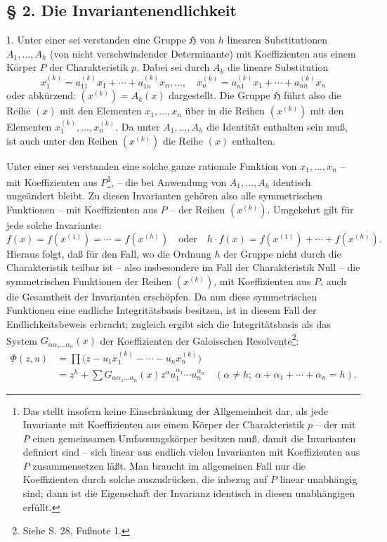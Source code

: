 \subsection*{§ 2. Die Invariantenendlichkeit}

1. Unter einer  sei verstanden eine Gruppe $\mathfrak H$ von $h$ linearen Substitutionen $A_1,\ldots,A_h$ (von nicht verschwindender Determinante) mit Koeffizienten aus einem Körper $P$ der Charakteristik $p$. Dabei sei durch $A_k$ die lineare Substitution
\[
 x_1^{(k)}=a_{11}^{(k)}x_1+\cdots+a_{1n}^{(k)}x_n,\ldots,\quad
 x_n^{(k)}=a_{n1}^{(k)}x_1+\cdots+a_{nn}^{(k)}x_n
\]
oder abkürzend: $(x^{(k)})=A_k(x)$ dargestellt. Die Gruppe $\mathfrak H$ führt also die Reihe $(x)$ mit den Elementen $x_1,\ldots,x_n$ über in die Reihen $(x^{(k)})$ mit den Elementen $x_1^{(k)},\ldots,x_n^{(k)}$. Da unter $A_1,\ldots,A_h$ die Identität enthalten sein muß, ist auch unter den Reihen $(x^{(k)})$ die Reihe $(x)$ enthalten.

Unter einer  sei verstanden eine solche ganze rationale Funktion von $x_1,\ldots,x_n$ -- mit Koeffizienten aus $P$\footnote{Das stellt insofern keine Einschränkung der Allgemeinheit dar, als jede Invariante mit Koeffizienten aus einem Körper der Charakteristik $p$ -- der mit $P$ einen gemeinsamen Umfassungskörper besitzen muß, damit die Invarianten definiert sind -- sich linear aus endlich vielen Invarianten mit Koeffizienten aus $P$ zusammensetzen läßt. Man braucht im allgemeinen Fall nur die Koeffizienten durch solche auszudrücken, die inbezug auf $P$ linear unabhängig sind; dann ist die Eigenschaft der Invarianz identisch in diesen unabhängigen erfüllt.}, -- die bei Anwendung von $A_1,\ldots,A_h$ identisch ungeändert bleibt. Zu diesen Invarianten gehören also alle symmetrischen Funktionen -- mit Koeffizienten aus $P$ -- der Reihen $(x^{(k)})$. Umgekehrt gilt für jede solche Invariante:
\[
 f(x)=f(x^{(1)})=\cdots=f(x^{(h)})
 \quad\text{oder}\quad
 h\cdot f(x)=f(x^{(1)})+\cdots+f(x^{(h)}).
\]
Hieraus folgt, daß für den Fall, wo die Ordnung $h$ der Gruppe nicht durch die Charakteristik teilbar ist -- also insbesondere im Fall der Charakteristik Null -- die symmetrischen Funktionen der Reihen $(x^{(k)})$, mit Koeffizienten aus $P$, auch die Gesamtheit der Invarianten erschöpfen. Da nun diese symmetrischen Funktionen eine endliche Integritätsbasis besitzen, ist in diesem Fall der Endlichkeitsbeweis erbracht; zugleich ergibt sich die Integritätsbasis als das System $G_{\alpha\alpha_1\ldots\alpha_n}(x)$ der Koeffizienten der Galoisschen Resolvente\footnote{Siehe S. 28, Fußnote 1.}:
\[
\begin{aligned}
\Phi(z,u)&=\prod\bigl(z-u_1x_1^{(k)}-\cdots-u_nx_n^{(k)}\bigr)\\
&=z^h+\sum G_{\alpha\alpha_1\ldots\alpha_n}(x)
 z^{\alpha}u_1^{\alpha_1}\cdots u_n^{\alpha_n}
 \quad(\alpha\ne h;\ \alpha+\alpha_1+\cdots+\alpha_n=h).
\end{aligned}
\]


